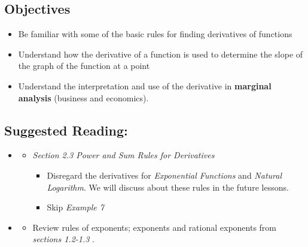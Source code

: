 \vspace{-0.25 in}
\begin{framed}
\subsection*{Objectives}
\begin{itemize}
    \item Be familiar with some of the basic rules for finding derivatives of functions
    \item Understand how the derivative of a function is used to determine the slope of the graph of the function at a point
    \item Understand the interpretation and use of the derivative in \textbf{marginal analysis} (business and economics).
\end{itemize}

\subsection*{Suggested Reading:}
\begin{itemize}
\item \cite{Calaway}\footnotemark[1]
   \begin{itemize}
        \item \emph{Section 2.3 Power and Sum Rules for Derivatives}
        \begin{itemize}
            \item Disregard the derivatives for \emph{Exponential Functions} and \emph{Natural Logarithm}. We will discuss about these rules in the future lessons.
            \item Skip \emph{Example 7}
        \end{itemize}
    \end{itemize}

\item \cite{openstaxColAlgebra}\footnotemark[2]
    \begin{itemize}
        \item Review rules of exponents; exponents and rational exponents from \emph{sections 1.2-1.3 }.
        
    \end{itemize}

\end{itemize}

\end{framed}
